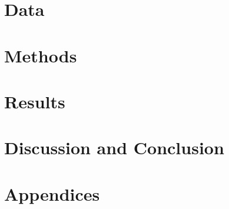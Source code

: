 \documentclass[twoside, b5paper, 11pt, openany]{report}
\numberwithin{equation}{chapter}
\numberwithin{figure}{chapter}
\numberwithin{table}{chapter}
\begin{document}
\linespread{1.213}\selectfont



\linespread{1.0}\selectfont

\cleardoublepage

\chapter{Data}\label{ch:data}

\linespread{1.213}\selectfont



\linespread{1.0}\selectfont

\cleardoublepage


\chapter{Methods}\label{ch:method}

\linespread{1.213}\selectfont



\linespread{1.0}\selectfont

\cleardoublepage


\chapter{Results}\label{ch:results}

\linespread{1.213}\selectfont



\linespread{1.0}\selectfont

\cleardoublepage


\chapter{Discussion and Conclusion}\label{ch:disc conc}

\linespread{1.213}\selectfont



\linespread{1.0}\selectfont

\cleardoublepage



\printbibliography[title={References}] %
\cleardoublepage


\chapter*{\LARGE \textbf{Appendices}}
\fancyhf{} %
\renewcommand{\headrulewidth}{0pt} %
\fancyfoot[C]{\thepage} %


\appendix

\end{document}
